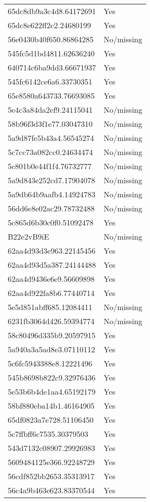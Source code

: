 \begin{tabular}{ll}
65dc8db9a3c4d8.64172691 & Yes \\
65dc8e622ff2c2.24680199 & Yes \\
56e0430b40f650.86864285 & No/missing \\
545fc5d1bd4811.62636240 & Yes \\
640714c6ba9dd3.66671937 & Yes \\
545fc6142ce6a6.33730351 & Yes \\
65e8580a643733.76693085 & Yes \\
5e4c3a84da2ef9.24115041 & No/missing \\
58b96f3d3f1e77.03047310 & No/missing \\
5a9d87fe5b43a4.56545274 & No/missing \\
5c7cc73a082cc0.24634474 & No/missing \\
5c801b0e44f1f4.76732777 & No/missing \\
5a9d843e252cd7.17904078 & No/missing \\
5a9db64b9aafb4.14924783 & No/missing \\
56dd6e8e02ac29.78732488 & No/missing \\
5c865d6b30c0f0.51092478 & Yes \\
B22e2vB9iE & No/missing \\
62aa4d93d3e963.22145456 & Yes \\
62aa4d93d5a387.24144488 & Yes \\
62aa4d9436e6e9.56609898 & Yes \\
62aa4d922fa8b6.77440714 & Yes \\
5e5d851abff685.12084411 & No/missing \\
6231fb3064d426.59394774 & No/missing \\
58c80496d335b9.20597915 & Yes \\
5a940a3a5ad8e3.07110112 & Yes \\
5c6fc5943388e8.12221496 & Yes \\
545b8698b822c9.32976436 & Yes \\
5e53b6b4de1aa4.65192179 & Yes \\
58bf880eba14b1.46164905 & Yes \\
65df0823a7e728.51106450 & Yes \\
5c7ffbff6c7535.30379503 & Yes \\
543d7132c08907.29926983 & Yes \\
5609484125e366.92248729 & Yes \\
56cdf852bb2653.35313917 & Yes \\
56c4a9b463e623.83370544 & Yes \\

\end{tabular}
